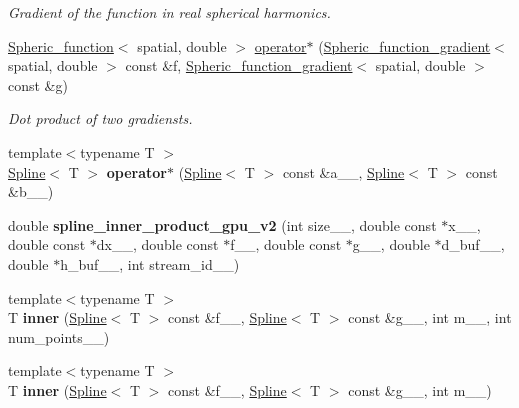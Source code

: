 \begin{DoxyCompactItemize}
\begin{DoxyCompactList}\small\item\em Gradient of the function in real spherical harmonics. \end{DoxyCompactList}\item 
\hyperlink{classsirius_1_1_spheric__function}{Spheric\+\_\+function}$<$ spatial, double $>$ \hyperlink{namespacesirius_aada1ce7c53f55d34cd6e099c62e2ed20}{operator$\ast$} (\hyperlink{classsirius_1_1_spheric__function__gradient}{Spheric\+\_\+function\+\_\+gradient}$<$ spatial, double $>$ const \&f, \hyperlink{classsirius_1_1_spheric__function__gradient}{Spheric\+\_\+function\+\_\+gradient}$<$ spatial, double $>$ const \&g)
\begin{DoxyCompactList}\small\item\em Dot product of two gradiensts. \end{DoxyCompactList}\item 
\hypertarget{namespacesirius_a99e9d684a6489d2c201361255ce5273c}{}{\footnotesize template$<$typename T $>$ }\\\hyperlink{classsirius_1_1_spline}{Spline}$<$ T $>$ {\bfseries operator$\ast$} (\hyperlink{classsirius_1_1_spline}{Spline}$<$ T $>$ const \&a\+\_\+\+\_\+, \hyperlink{classsirius_1_1_spline}{Spline}$<$ T $>$ const \&b\+\_\+\+\_\+)\label{namespacesirius_a99e9d684a6489d2c201361255ce5273c}

\item 
\hypertarget{namespacesirius_ad3ffae16f98adce0153dabb66ced815b}{}double {\bfseries spline\+\_\+inner\+\_\+product\+\_\+gpu\+\_\+v2} (int size\+\_\+\+\_\+, double const $\ast$x\+\_\+\+\_\+, double const $\ast$dx\+\_\+\+\_\+, double const $\ast$f\+\_\+\+\_\+, double const $\ast$g\+\_\+\+\_\+, double $\ast$d\+\_\+buf\+\_\+\+\_\+, double $\ast$h\+\_\+buf\+\_\+\+\_\+, int stream\+\_\+id\+\_\+\+\_\+)\label{namespacesirius_ad3ffae16f98adce0153dabb66ced815b}

\item 
\hypertarget{namespacesirius_aae0ffae0786561a74213c96350ad9458}{}{\footnotesize template$<$typename T $>$ }\\T {\bfseries inner} (\hyperlink{classsirius_1_1_spline}{Spline}$<$ T $>$ const \&f\+\_\+\+\_\+, \hyperlink{classsirius_1_1_spline}{Spline}$<$ T $>$ const \&g\+\_\+\+\_\+, int m\+\_\+\+\_\+, int num\+\_\+points\+\_\+\+\_\+)\label{namespacesirius_aae0ffae0786561a74213c96350ad9458}

\item 
\hypertarget{namespacesirius_ae04bf45b2b7bb6275d7eed6b7cc74c44}{}{\footnotesize template$<$typename T $>$ }\\T {\bfseries inner} (\hyperlink{classsirius_1_1_spline}{Spline}$<$ T $>$ const \&f\+\_\+\+\_\+, \hyperlink{classsirius_1_1_spline}{Spline}$<$ T $>$ const \&g\+\_\+\+\_\+, int m\+\_\+\+\_\+)\label{namespacesirius_ae04bf45b2b7bb6275d7eed6b7cc74c44}

\end{DoxyCompactItemize}
